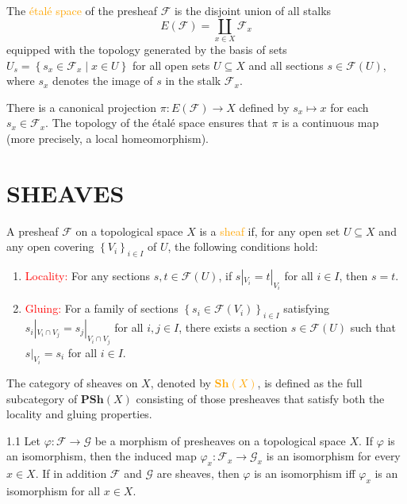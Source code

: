\begin{definition}
	The \textcolor{orange}{\'etal\'e space} of the presheaf $\mathcal{F}$ is the disjoint union of all stalks
	\begin{equation*}
		E(\mathcal{F})=\coprod_{x\in X}\mathcal{F}_x
	\end{equation*}
	equipped with the topology generated by the basis of sets $U_s=\left\{s_x\in\mathcal{F}_x\mid x\in U\right\}$ for all open sets $U\subseteq X$ and all sections $s\in\mathcal{F}(U)$, where $s_x$ denotes the image of $s$ in the stalk $\mathcal{F}_x$.
	
	There is a canonical projection $\pi: E(\mathcal{F}) \rightarrow X$ defined by $s_x \mapsto x$ for each $s_x \in \mathcal{F}_x$. The topology of the \'etal\'e space ensures that $\pi$ is a continuous map (more precisely, a local homeomorphism).
\end{definition}


\section*{SHEAVES}

\begin{definition}
	A presheaf $\mathcal{F}$ on a topological space $X$ is a \textcolor{orange}{sheaf} if, for any open set $U\subseteq X$ and any open covering $\left\{V_i\right\}_{i\in I}$ of $U$, the following conditions hold:
	\begin{enumerate}[label=\textup{(\arabic*)}]
		\item \textcolor{red}{Locality:} For any sections $s, t\in\mathcal{F}(U)$, if $s|_{V_i}=t|_{V_i}$ for all $i\in I$, then $s = t$.
		\item \textcolor{red}{Gluing:} For a family of sections $\left\{s_i\in\mathcal{F}\!\left(V_i\right)\right\}_{i\in I}$ satisfying $s_i|_{V_i\cap V_j}=s_j|_{V_i\cap V_j}$ for all $i, j\in I$, there exists a section $s\in\mathcal{F}(U)$ such that $s|_{V_i}=s_i$ for all $i\in I$.
	\end{enumerate}
	
	The category of sheaves on $X$, denoted by \textcolor{orange}{$\mathbf{Sh}(X)$}, is defined as the full subcategory of $\mathbf{PSh}(X)$ consisting of those presheaves that satisfy both the locality and gluing properties.
\end{definition}

\begin{proposition}{1.1}
	Let $\varphi:\mathcal{F}\rightarrow\mathcal{G}$ be a morphism of presheaves on a topological space $X$. If $\varphi$ is an isomorphism, then the induced map $\varphi_x:\mathcal{F}_x\rightarrow\mathcal{G}_x$ is an isomorphism for every $x\in X$. If in addition $\mathcal{F}$ and $\mathcal{G}$ are sheaves, then $\varphi$ is an isomorphism iff $\varphi_x$ is an isomorphism for all $x\in X$.
\end{proposition}

